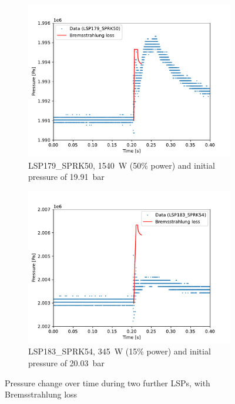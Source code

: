         \begin{figure}[!ht]
            \centering
            \begin{subfigure}[t]{0.45\textwidth}
                \centering
                \includegraphics[width=\textwidth]{assets/2 models/LSP179_SPRK50.pdf}
                \caption{LSP179\_SPRK50, \qty{1540}{W} (50\% power) and initial pressure of \qty{19.91}{bar}}
            \end{subfigure}
            \hfill
            \begin{subfigure}[t]{0.45\textwidth}
                \centering
                \includegraphics[width=\textwidth]{assets/2 models/LSP183_SPRK54.pdf}
                \caption{LSP183\_SPRK54, \qty{345}{W} (15\% power) and initial pressure of \qty{20.03}{bar}}
            \end{subfigure}
            \caption{Pressure change over time during two further LSPs, with Bremsstrahlung loss}
            \label{fig:Two further LSPs}
        \end{figure}


